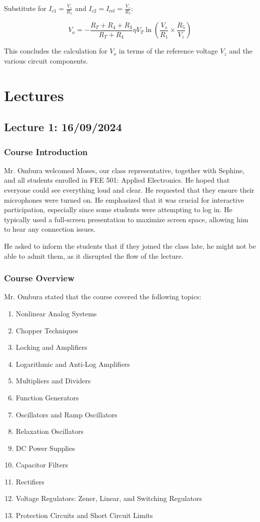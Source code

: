 \documentclass[a4paper,9pt,twoside,openany,twocolumn]{memoir}
\begin{document}
Substitute for \( I_{c1} = \frac{V_s}{R_1} \) and \( I_{c2} = I_{\text{ref}} = \frac{V_z}{R_5} \):

\[
V_o = -\frac{R_T + R_4 + R_3}{R_T + R_4} \eta V_T \ln \left( \frac{V_s}{R_1} \times \frac{R_5}{V_z} \right) \tag{19}
\]

This concludes the calculation for \( V_o \) in terms of the reference voltage \( V_z \) and the various circuit components.

\chapter{Lectures}
\section*{Lecture 1: 16/09/2024}

\subsection{Course Introduction}

Mr. Ombura welcomed Moses, our class representative, together with Sephine, and all students enrolled in FEE 501: Applied Electronics. He hoped that everyone could see everything loud and clear. He requested that they ensure their microphones were turned on. He emphasized that it was crucial for interactive participation, especially since some students were attempting to log in. He typically used a full-screen presentation to maximize screen space, allowing him to hear any connection issues.

He asked to inform the students that if they joined the class late, he might not be able to admit them, as it disrupted the flow of the lecture.

\subsection{Course Overview}

Mr. Ombura stated that the course covered the following topics:

\begin{enumerate}
    \item Nonlinear Analog Systems
    \item Chopper Techniques
    \item Locking and Amplifiers
    \item Logarithmic and Anti-Log Amplifiers
    \item Multipliers and Dividers
    \item Function Generators
    \item Oscillators and Ramp Oscillators
    \item Relaxation Oscillators
    \item DC Power Supplies
    \item Capacitor Filters
    \item Rectifiers
    \item Voltage Regulators: Zener, Linear, and Switching Regulators
    \item Protection Circuits and Short Circuit Limits
\end{enumerate}
\end{document}
